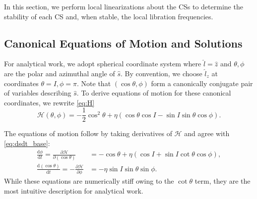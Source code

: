 \documentclass[
        fleqn,
        usenatbib,
        referee,
    ]{mnras}
\newcommand*{\rd}[2]{\frac{\mathrm{d}#1}{\mathrm{d}#2}}
\newcommand*{\pd}[2]{\frac{\partial#1}{\partial#2}}
\newcommand*{\p}[1]{\left(#1\right)}
\begin{document}
In this section, we perform local linearizations about the CSs to determine the
stability of each CS and, when stable, the local libration frequencies.

\subsection{Canonical Equations of Motion and Solutions}

For analytical work, we adopt spherical coordinate system where $\hat{l} =
\hat{z}$ and $\theta, \phi$ are the polar and azimuthal angle of $\hat{s}$. By
convention, we choose $\hat{l}_z$ at coordinates $\theta = I, \phi = \pi$.
Note that $\p{\cos \theta, \phi}$ form a canonically conjugate pair of variables
describing $\hat{s}$. To derive equations of motion for these canonical
coordinates, we rewrite \autoref{eq:H}
\begin{equation}
    \mathcal{H}\p{\theta, \phi} = -\frac{1}{2}\cos^2\theta
            + \eta \p{\cos \theta \cos I - \sin I \sin \theta \cos \phi}.
\end{equation}

The equations of motion follow by taking derivatives of $\mathcal{H}$ and agree
with \autoref{eq:dsdt_base}:
\begin{subequations}\label{se:H_eom}
    \begin{align}
        \rd{\phi}{t} = \pd{\mathcal{H}}{(\cos\theta)}
            &= -\cos\theta + \eta\p{\cos I + \sin I \cot \theta \cos \phi},
                \label{seq:H_eom_phi_t}\\
        \rd{(\cos \theta)}{t} = -\pd{\mathcal{H}}{\phi}
            &= -\eta \sin I \sin \theta \sin \phi.
                \label{seq:H_eom_mu_t}
    \end{align}
\end{subequations}
While these equations are numerically stiff owing to the $\cot\theta$ term, they
are the most intuitive description for analytical work.
\end{document}
